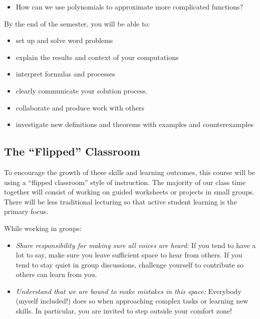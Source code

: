 \documentclass[11pt]{amsart}
\begin{document}
\begin{itemize}
\item How can we use polynomials to approximate more complicated functions?
\end{itemize}

By the end of the semester, you will be able to:
\begin{itemize}
\item set up and solve word problems
\item explain the results and context of your computations
\item interpret formulas and processes
\item clearly communicate your solution process.
\item collaborate and produce work with others
\item investigate new definitions and theorems with examples and counterexamples
\end{itemize}


\subsection*{The ``Flipped'' Classroom}

To encourage the growth of these skills and learning outcomes,
this course will be using a ``flipped classroom'' style of instruction.
The majority of our class time together will consist of working on guided worksheets or projects in small groups.
There will be less traditional lecturing so that active student learning is the primary focus.

While working in groups:
\begin{itemize}
\item \textit{Share responsibility for making sure all voices are heard:}
        If you tend to have a lot to say, make sure you leave sufficient space to hear from others. If you tend to stay quiet in group discussions, challenge yourself to contribute so others can learn from you.
\item \textit{Understand that we are bound to make mistakes in this space:}
        Everybody (myself included!) does so when approaching complex tasks or learning new skills. In particular, you are invited to step outside your comfort zone!
\end{itemize}
\end{document}

